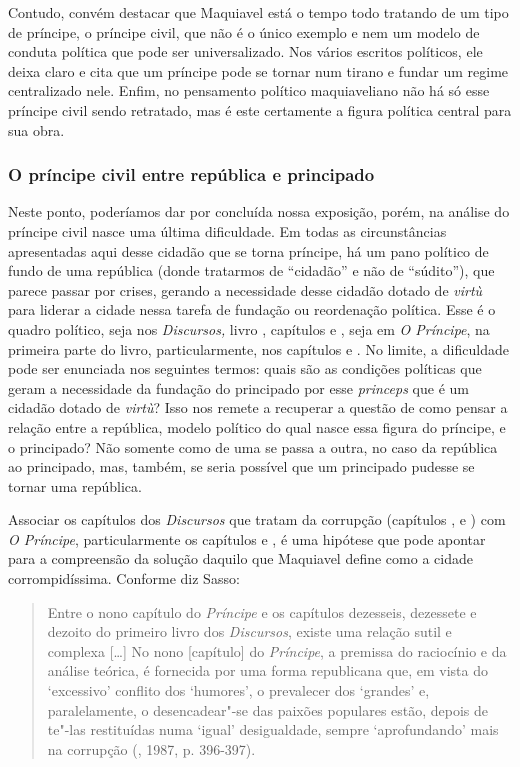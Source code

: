 Contudo, convém destacar que Maquiavel está o tempo todo tratando de um
tipo de príncipe, o príncipe civil, que não é o único exemplo e nem um
modelo de conduta política que pode ser universalizado. Nos vários
escritos políticos, ele deixa claro e cita que um príncipe pode se
tornar num tirano e fundar um regime centralizado nele. Enfim, no
pensamento político maquiaveliano não há só esse príncipe civil sendo
retratado, mas é este certamente a figura política central para sua
obra.

\subsubsection{O príncipe civil entre república e principado}

Neste ponto, poderíamos dar por concluída nossa exposição, porém, na
análise do príncipe civil nasce uma última dificuldade. Em todas as
circunstâncias apresentadas aqui desse cidadão que se torna príncipe, há
um pano político de fundo de uma república (donde tratarmos de
``cidadão'' e não de ``súdito''), que parece passar por crises, gerando
a necessidade desse cidadão dotado de \emph{virtù} para liderar a cidade
nessa tarefa de fundação ou reordenação política. Esse é o quadro
político, seja nos \emph{Discursos,} livro , capítulos  e
, seja em \emph{O Príncipe}, na primeira parte do livro,
particularmente, nos capítulos  e . No limite, a dificuldade pode
ser enunciada nos seguintes termos: quais são as condições políticas que
geram a necessidade da fundação do principado por esse \emph{princeps}
que é um cidadão dotado de \emph{virtù}? Isso nos remete a recuperar a
questão de como pensar a relação entre a república, modelo político do
qual nasce essa figura do príncipe, e o principado? Não somente como de
uma se passa a outra, no caso da república ao principado, mas, também,
se seria possível que um principado pudesse se tornar uma república.

Associar os capítulos dos \emph{Discursos} que tratam da corrupção
(capítulos ,  e ) com \emph{O Príncipe},
particularmente os capítulos  e , é uma hipótese que pode apontar
para a compreensão da solução daquilo que Maquiavel define como a cidade
corrompidíssima. Conforme diz Sasso:

\begin{quote}
Entre o nono capítulo do \emph{Príncipe} e os capítulos dezesseis,
dezessete e dezoito do primeiro livro dos \emph{Discursos}, existe uma
relação sutil e complexa {[}\ldots{}{]} No nono {[}capítulo{]} do
\emph{Príncipe}, a premissa do raciocínio e da análise teórica, é
fornecida por uma forma republicana que, em vista do `excessivo'
conflito dos `humores', o prevalecer dos `grandes' e, paralelamente, o
desencadear"-se das paixões populares estão, depois de te"-las restituídas
numa `igual' desigualdade, sempre `aprofundando' mais na corrupção
(, 1987, p. 396-397).
\end{quote}

